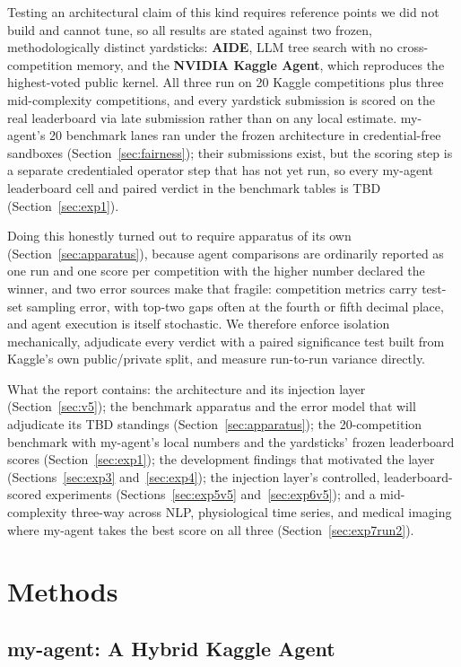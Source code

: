 \documentclass[11pt,a4paper]{article}
\begin{document}
Testing an architectural claim of this kind requires reference points we did not build and cannot tune, so all results are stated against two frozen, methodologically distinct yardsticks: \textbf{AIDE}, LLM tree search with no cross-competition memory, and the \textbf{NVIDIA Kaggle Agent}, which reproduces the highest-voted public kernel. All three run on 20 Kaggle competitions plus three mid-complexity competitions, and every yardstick submission is scored on the real leaderboard via late submission rather than on any local estimate. my-agent's 20 benchmark lanes ran under the frozen architecture in credential-free sandboxes (Section~\ref{sec:fairness}); their submissions exist, but the scoring step is a separate credentialed operator step that has not yet run, so every my-agent leaderboard cell and paired verdict in the benchmark tables is TBD (Section~\ref{sec:exp1}).

Doing this honestly turned out to require apparatus of its own (Section~\ref{sec:apparatus}), because agent comparisons are ordinarily reported as one run and one score per competition with the higher number declared the winner, and two error sources make that fragile: competition metrics carry test-set sampling error, with top-two gaps often at the fourth or fifth decimal place, and agent execution is itself stochastic. We therefore enforce isolation mechanically, adjudicate every verdict with a paired significance test built from Kaggle's own public/private split, and measure run-to-run variance directly.

What the report contains: the architecture and its injection layer (Section~\ref{sec:v5}); the benchmark apparatus and the error model that will adjudicate its TBD standings (Section~\ref{sec:apparatus}); the 20-competition benchmark with my-agent's local numbers and the yardsticks' frozen leaderboard scores (Section~\ref{sec:exp1}); the development findings that motivated the layer (Sections~\ref{sec:exp3} and~\ref{sec:exp4}); the injection layer's controlled, leaderboard-scored experiments (Sections~\ref{sec:exp5v5} and~\ref{sec:exp6v5}); and a mid-complexity three-way across NLP, physiological time series, and medical imaging where my-agent takes the best score on all three (Section~\ref{sec:exp7run2}).

\section{Methods}

\subsection{my-agent: A Hybrid Kaggle Agent}
\end{document}
